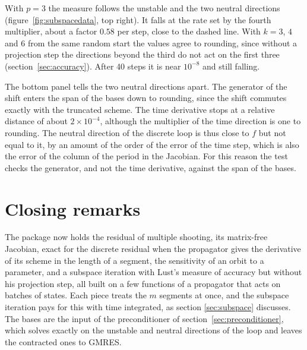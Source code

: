 \documentclass[11pt,a4paper]{article}
\begin{document}
With $p = 3$ the measure follows the unstable and the two neutral directions
(figure~\ref{fig:subspacedata}, top right). It falls at the rate set by the fourth multiplier,
about a factor $0.58$ per step, close to the dashed line. With $k = 3$, $4$ and $6$ from the same
random start the values agree to rounding, since without a projection step the directions beyond
the third do not act on the first three (section~\ref{sec:accuracy}). After 40 steps it is near
$10^{-8}$ and still falling.

The bottom panel tells the two neutral directions apart. The generator of the shift enters the
span of the bases down to rounding, since the shift commutes exactly with the truncated scheme.
The time derivative stops at a relative distance of about $2 \times 10^{-4}$, although the
multiplier of the time direction is one to rounding. The neutral direction of the discrete loop is
thus close to $f$ but not equal to it, by an amount of the order of the error of the time step,
which is also the error of the column of the period in the Jacobian. For this reason the test
checks the generator, and not the time derivative, against the span of the bases.

\section{Closing remarks}

The package now holds the residual of multiple shooting, its matrix-free Jacobian, exact for the
discrete residual when the propagator gives the derivative of its scheme in the length of a
segment, the sensitivity of an orbit to a parameter, and a subspace iteration with
Lust's measure of accuracy but without his projection step, all built on a few functions of a
propagator that acts on batches of states. Each piece treats the $m$ segments at
once, and the subspace iteration pays for this with time integrated, as section
\ref{sec:subspace} discusses. The bases are the input of the preconditioner of section~\ref{sec:preconditioner}, which solves
exactly on the unstable and neutral directions of the loop and leaves the contracted ones to
GMRES.



\end{document}
